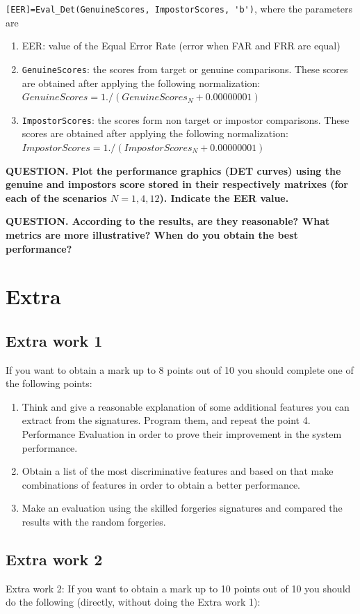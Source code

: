 \documentclass[a4paper]{article}
\def\inline{\lstinline[basicstyle=\ttfamily,keywordstyle={}]}
\begin{document}
{\inline{[EER]=Eval_Det(GenuineScores, ImpostorScores, 'b')}, where the parameters are
\begin{enumerate}
\item	EER: value of the Equal Error Rate (error when FAR and FRR are equal)
\item	\inline{GenuineScores}: the scores from target or genuine comparisons. These scores are obtained after applying the following normalization: \(GenuineScores = 1./(GenuineScores_N+0.00000001)\)
\item	\inline{ImpostorScores}: the scores form non target or impostor comparisons. These scores are obtained after applying the following normalization: \(ImpostorScores =1./(ImpostorScores_N+0.00000001)\)
\end{enumerate}

\textbf{QUESTION. Plot the performance graphics (DET curves) using the genuine and impostors score stored in their respectively matrixes (for each of the scenarios \(N=1,4,12\)). Indicate the EER value.}


\textbf{QUESTION. According to the results, are they reasonable? What metrics are more illustrative? When do you obtain the best performance? }


\section{Extra}

\subsection{Extra work 1}
 If you want to obtain a mark up to 8 points out of 10 you should complete one of the following points:
 \begin{enumerate}
\item Think and give a reasonable explanation of some additional features you can extract from the signatures. Program them, and repeat the point 4. Performance Evaluation in order to prove their improvement in the system performance. 
\item 	Obtain a list of the most discriminative features and based on that make combinations of features in order to obtain a better performance.
\item 	Make an evaluation using the skilled forgeries signatures and compared the results with the random forgeries.
 \end{enumerate}

 \subsection{Extra work 2}
Extra work 2: If you want to obtain a mark up to 10 points out of 10 you should do the following (directly, without doing the Extra work 1):

}
\end{document}
